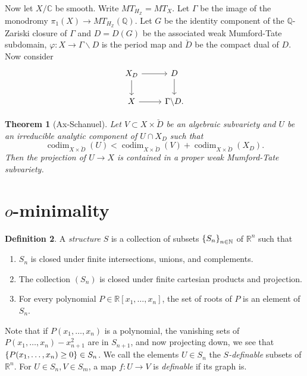 \documentclass[leqno, openany]{memoir}
\newtheorem{thm}{Theorem}[section]
\theoremstyle{definition}
\newtheorem{defn}[thm]{Definition}
\theoremstyle{remark}
\theoremstyle{plain}
\theoremstyle{definition}
\theoremstyle{remark}
\newcommand{\R}{\mathbb{R}}
\newcommand{\C}{\mathbb{C}}
\newcommand{\Z}{\mathbb{Z}}
\newcommand{\Q}{\mathbb{Q}}
\newcommand{\on}[1]{\operatorname{#1}}
\begin{document}
Now let $X/\C$ be smooth. Write $MT_{H_{\Z}} = MT_X$. Let $\Gamma$ be the image of the monodromy $\pi_1(X) \to MT_{H_{\Z}}(\Q)$. Let $G$ be the identity component of the $\Q$-Zariski closure of $\Gamma$ and $D = D(G)$ be the associated weak Mumford-Tate subdomain, $\varphi \colon X \to \Gamma \backslash D$ is the period map and $\check{D}$ be the compact dual of $D$. Now consider
\begin{equation*}
\begin{tikzcd}
    X_D \ar{r} \ar{d} & D \ar{d} \\
    X \ar{r} & \Gamma \backslash D.
\end{tikzcd}
\end{equation*}
\begin{thm}[Ax-Schanuel]
    Let $V \subset X \times \check{D}$ be an algebraic subvariety and $U$ be an irreducible analytic component of $U \cap X_D$ such that 
    \[ \on{codim}_{X \times \check{D}}(U) < \on{codim}_{X \times \check{D}} (V) + \on{codim}_{X \times \check{D}} (X_D). \] 
    Then the projection of $U \to X$ is contained in a proper weak Mumford-Tate subvariety.
\end{thm}

\section{$o$-minimality}%
\label{sec:_o_minimality}

\begin{defn}
    A \textit{structure} $S$ is a collection of subsets $\qty{S_n}_{n \in \mathbb{N}}$ of $\R^n$ such that
    \begin{enumerate}
        \item $S_n$ is closed under finite intersections, unions, and complements.
        \item The collection $(S_n)$ is closed under finite cartesian products and projection.
        \item For every polynomial $P \in \R[x_1, \ldots, x_n]$, the set of roots of $P$ is an element of $S_n$.
    \end{enumerate}
\end{defn}
Note that if $P(x_1, \ldots, x_n)$ is a polynomial, the vanishing sets of $P(x_1, \ldots, x_n) - x_{n+1}^2$ are in $S_{n+1}$, and now projecting down, we see that $\qty{P(x_1, \ldots, x_n) \geq 0} \in S_n$. We call the elements $U \in S_n$ the \textit{$S$-definable} subsets of $\R^n$. For $U \in S_n, V \in S_m$, a map $f \colon U \to V$ is \textit{definable} if its graph is.
\end{document}
